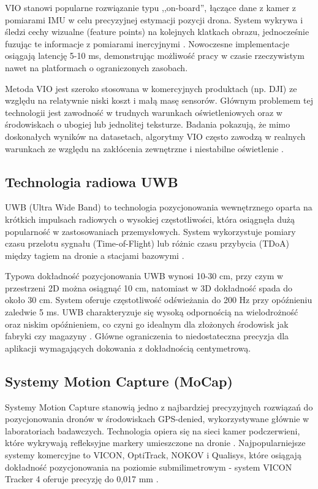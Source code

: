 \documentclass{EE-dyplom}
\begin{document}
VIO stanowi popularne rozwiązanie typu ,,on-board'', łączące dane z kamer z pomiarami IMU w celu precyzyjnej estymacji pozycji drona. System wykrywa i śledzi cechy wizualne (feature points) na kolejnych klatkach obrazu, jednocześnie fuzując te informacje z pomiarami inercyjnymi \cite{vio_pmc2024}. Nowoczesne implementacje osiągają latencję 5-10 ms, demonstrując możliwość pracy w czasie rzeczywistym nawet na platformach o ograniczonych zasobach.

Metoda VIO jest szeroko stosowana w komercyjnych produktach (np. DJI) ze względu na relatywnie niski koszt i małą masę sensorów. Głównym problemem tej technologii jest zawodność w trudnych warunkach oświetleniowych oraz w środowiskach o ubogiej lub jednolitej teksturze. Badania pokazują, że mimo doskonałych wyników na datasetach, algorytmy VIO często zawodzą w realnych warunkach ze względu na zakłócenia zewnętrzne i niestabilne oświetlenie \cite{vio_arxiv2023}.


\subsection{Technologia radiowa UWB}

UWB (Ultra Wide Band) to technologia pozycjonowania wewnętrznego oparta na krótkich impulsach radiowych o wysokiej częstotliwości, która osiągnęła dużą popularność w zastosowaniach przemysłowych. System wykorzystuje pomiary czasu przelotu sygnału (Time-of-Flight) lub różnic czasu przybycia (TDoA) między tagiem na dronie a stacjami bazowymi \cite{uwb_elsevier2023}.

Typowa dokładność pozycjonowania UWB wynosi 10-30 cm, przy czym w przestrzeni 2D można osiągnąć 10 cm, natomiast w 3D dokładność spada do około 30 cm. System oferuje częstotliwość odświeżania do 200 Hz przy opóźnieniu zaledwie 5 ms. UWB charakteryzuje się wysoką odpornością na wielodrożność oraz niskim opóźnieniem, co czyni go idealnym dla złożonych środowisk jak fabryki czy magazyny \cite{uwb_tmk2025}. Główne ograniczenia to niedostateczna precyzja dla aplikacji wymagających dokowania z dokładnością centymetrową.

\subsection{Systemy Motion Capture (MoCap)}

Systemy Motion Capture stanowią jedno z najbardziej precyzyjnych rozwiązań do pozycjonowania dronów w środowiskach GPS-denied, wykorzystywane głównie w laboratoriach badawczych. Technologia opiera się na sieci kamer podczerwieni, które wykrywają refleksyjne markery umieszczone na dronie \cite{px4_mocap2025}. Najpopularniejsze systemy komercyjne to VICON, OptiTrack, NOKOV i Qualisys, które osiągają dokładność pozycjonowania na poziomie submilimetrowym - system VICON Tracker 4 oferuje precyzję do 0,017 mm \cite{vicon2025}.
\end{document}
